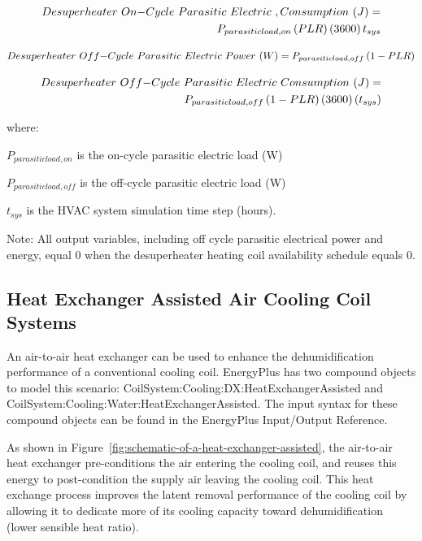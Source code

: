 \begin{equation}
\begin{split}
Desuperheater~On{\rm{ - }}Cycle~Parasitic~Electric~,Consumption~(J) = \\{P_{parasiticload,on}}\left( {PLR} \right)\left( {3600} \right){t_{sys}}
\end{split}
\end{equation}

\begin{equation}
Desuperheater~Off{\rm{ - }}Cycle~Parasitic~Electric~Power~(W) = {P_{parasiticload,off}}\left( {1 - PLR} \right)
\end{equation}

\begin{equation}
\begin{split}
Desuperheater~Off{\rm{ - }}Cycle~Parasitic~Electric~Consumption~(J) = \\{P_{parasiticload,off}}\left( {1 - PLR} \right)\left( {3600} \right)\left( {{t_{sys}}} \right)
\end{split}
\end{equation}

where:

\({P_{parasiticload,on}}\) is the on-cycle parasitic electric load (W)

\({P_{parasiticload,off}}\) is the off-cycle parasitic electric load (W)

\({t_{sys}}\) is the HVAC system simulation time step (hours).

Note: All output variables, including off cycle parasitic electrical power and energy, equal 0 when the desuperheater heating coil availability schedule equals 0.

\subsection{Heat Exchanger Assisted Air Cooling Coil Systems}\label{heat-exchanger-assisted-air-cooling-coil-systems}

An air-to-air heat exchanger can be used to enhance the dehumidification performance of a conventional cooling coil. EnergyPlus has two compound objects to model this scenario: CoilSystem:Cooling:DX:HeatExchangerAssisted and CoilSystem:Cooling:Water:HeatExchangerAssisted. The input syntax for these compound objects can be found in the EnergyPlus Input/Output Reference.

As shown in Figure~\ref{fig:schematic-of-a-heat-exchanger-assisted}, the air-to-air heat exchanger pre-conditions the air entering the cooling coil, and reuses this energy to post-condition the supply air leaving the cooling coil. This heat exchange process improves the latent removal performance of the cooling coil by allowing it to dedicate more of its cooling capacity toward dehumidification (lower sensible heat ratio).

